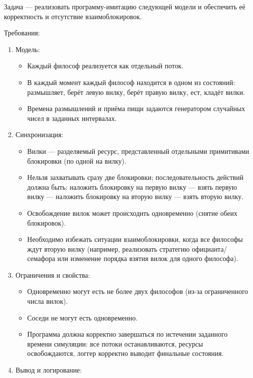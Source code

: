 \documentclass[a4paper, 14pt]{extarticle}
\begin{document}
Задача — реализовать программу-имитацию следующей модели и обеспечить её корректность и отсутствие взаимоблокировок.

Требования:
\begin{enumerate}
    \item Модель:
        \begin{itemize}
            \item Каждый философ реализуется как отдельный поток.
            \item В каждый момент каждый философ находится в одном из состояний: размышляет, берёт левую вилку, берёт правую вилку, ест, кладёт вилки.
            \item Времена размышлений и приёма пищи задаются генератором случайных чисел в заданных интервалах.
        \end{itemize}
    \item Синхронизация:
        \begin{itemize}
            \item Вилки — разделяемый ресурс, представленный отдельными примитивами блокировки (по одной на вилку).
            \item Нельзя захватывать сразу две блокировки; последовательность действий должна быть: наложить блокировку на первую вилку — взять первую вилку — наложить блокировку на вторую вилку — взять вторую вилку.
            \item Освобождение вилок может происходить одновременно (снятие обеих блокировок).
            \item Необходимо избежать ситуации взаимоблокировки, когда все философы ждут вторую вилку (например, реализовать стратегию официанта/семафора или изменение порядка взятия вилок для одного философа).
        \end{itemize}
    \item Ограничения и свойства:
        \begin{itemize}
            \item Одновременно могут есть не более двух философов (из-за ограниченного числа вилок).
            \item Соседи не могут есть одновременно.
            \item Программа должна корректно завершаться по истечении заданного времени симуляции: все потоки останавливаются, ресурсы освобождаются, логгер корректно выводит финальные состояния.
        \end{itemize}
    \item Вывод и логирование:
        \begin{itemize}

\end{itemize}
\end{enumerate}
\end{document}
